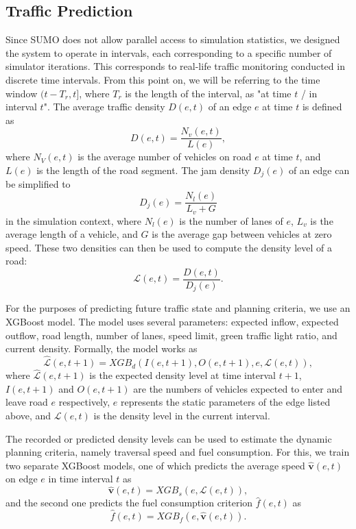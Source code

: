 \documentclass[sigconf]{aamas}
\begin{document}
\subsection{Traffic Prediction}
Since SUMO does not allow parallel access to simulation statistics, we designed the system to operate in intervals, each corresponding to a specific number of simulator iterations. This corresponds to real-life traffic monitoring conducted in discrete time intervals. From this point on, we will be referring to the time window $(t-T_r, t]$, where $T_r$ is the length of the interval, as "at time $t$ / in interval $t$". The average traffic density $D(e, t)$ of an edge $e$ at time $t$ is defined as
\begin{equation}
    D(e, t) = \frac{N_v(e, t)}{L(e)},
\end{equation}
where $N_V (e, t)$ is the average number of vehicles on road $e$ at time $t$, and $L(e)$ is the length of the road segment. The jam density $D_j (e)$ of an edge can be simplified to 
\begin{equation}
    D_j (e) = \frac{N_l(e)}{L_v + G}
\end{equation}
in the simulation context, where $N_l (e)$ is the number of lanes of $e$, $L_v$ is the average length of a vehicle, and $G$ is the average gap between vehicles at zero speed.  These two densities can then be used to compute the density level of a road:
\begin{equation}
    \mathcal{L}(e, t) = \frac{D(e, t)}{D_j(e)}.
\end{equation}

For the purposes of predicting future traffic state and planning criteria, we use an XGBoost \cite{xgboost} model. The model uses several parameters: expected inflow, expected outflow, road length, number of lanes, speed limit, green traffic light ratio, and current density. Formally, the model works as
\begin{equation}
    \hat{\mathcal{L}}(e, t+1) = XGB_d(I(e, t+1), O(e, t+1), e, \mathcal{L}(e, t)),
    \label{ref:trafficPred}
\end{equation}
where $\hat{\mathcal{L}}(e, t+1)$ is the expected density level at time interval $t+1$, $I(e, t+1)$ and $O(e, t+1)$ are the numbers of vehicles expected to enter and leave road $e$ respectively, $e$ represents the static parameters of the edge listed above, and $\mathcal{L}(e, t)$ is the density level in the current interval. 

The recorded or predicted density levels can be used to estimate the dynamic planning criteria, namely traversal speed and fuel consumption. For this, we train two separate XGBoost models, one of which predicts the average speed $\hat{\mathbf{v}}(e, t)$ on edge $e$ in time interval $t$ as
\begin{equation}
    \hat{\mathbf{v}}(e, t) = XGB_s (e, \mathcal{L}(e, t)),
    \label{ref:speedPred}
\end{equation}
and the second one predicts the fuel consumption criterion $\hat{f}(e, t)$ as
\begin{equation}
    \hat{f}(e, t) = XGB_f(e, \hat{\mathbf{v}}(e, t)).
\label{ref:fuelPred}
\end{equation}
\end{document}
